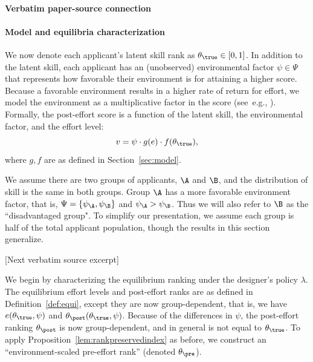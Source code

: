 \documentclass[10pt]{article}
\begin{document}
\paragraph{Verbatim paper-source connection}
\begin{ReviewVerbatim}
\paragraph{Model and equilibria characterization} We now denote each applicant's latent skill rank as $\theta_\true \in [0,1]$. In addition to the latent skill, each applicant has an (unobserved) environmental factor $\psi \in \Psi$ that represents how favorable their environment is for attaining a higher score. Because a favorable environment results in a higher rate of return for effort, we model the environment as a multiplicative factor in the score (see~e.g., \citet{calsamiglia09decent}). Formally, the post-effort score is a function of the latent skill, the environmental factor, and the effort level:
\begin{equation*}\label{eq:env-score}
v = \psi \cdot  g(e)\cdot f(\theta_\true),
\end{equation*}
where $g, f$ are as defined in Section~\ref{sec:model}. %


 We assume there are two groups of applicants, $\A$ and $\B$, and the distribution of skill is the same in both groups. Group $\A$ has a more favorable environment factor, that is,  $\Psi = \{\psi_\A, \psi_\B\}$ and $\psi_\A > \psi_\B$. Thus we will also refer to $\B$ as the ``disadvantaged group". To simplify our presentation, we assume each group is half of the total applicant population, though the results in this section generalize.%

[Next verbatim source excerpt]

We begin by characterizing the equilibrium ranking under the designer's policy $\lambda$. The equilibrium effort levels and post-effort ranks are as defined in Definition~\ref{def:equi}, except they are now group-dependent, that is, we have $e(\theta_\true, \psi)$ and $\theta_\post(\theta_\true, \psi)$. Because of the differences in $\psi$, the post-effort ranking $\theta_\post$ is now group-dependent, and in general is not equal to $\theta_\true$. To apply Proposition~\ref{lem:rankpreservedindex} as before, we construct an ``environment-scaled pre-effort rank'' (denoted $\theta_\pre$).
\end{ReviewVerbatim}
\end{document}

